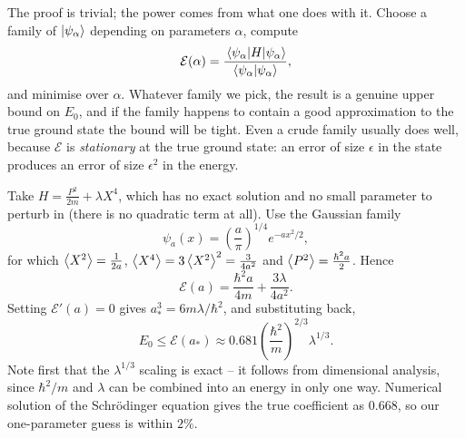 \documentclass[a4paper]{scrartcl}
\begin{document}
The proof is trivial; the power comes from what one does with it. Choose a family of  $\ket{\psi_\alpha}$ depending on parameters $\alpha$, compute
$$
\mathcal{E}(\alpha) = \frac{\mel{\psi_\alpha}{H}{\psi_\alpha}}{\braket{\psi_\alpha}{\psi_\alpha}},
$$
and minimise over $\alpha$. Whatever family we pick, the result is a genuine upper bound on $E_0$, and if the family happens to contain a good approximation to the true ground state the bound will be tight. Even a crude family usually does well, because $\mathcal{E}$ is \emph{stationary} at the true ground state: an error of size $\epsilon$ in the state produces an error of size $\epsilon^2$ in the energy.

\begin{center}
\end{center}

\begin{example}
    Take $H = \frac{P^2}{2m} + \lambda X^4$, which has no exact solution and no small parameter to perturb in (there is no quadratic term at all). Use the Gaussian family
    $$
    \psi_a(x) = \left(\frac{a}{\pi}\right)^{1/4}e^{-ax^2/2},
    $$
    for which $\expval{X^2} = \frac{1}{2a}$, $\expval{X^4} = 3\expval{X^2}^2 = \frac{3}{4a^2}$ and $\expval{P^2} = \frac{\hbar^2 a}{2}$. Hence
    $$
    \mathcal{E}(a) = \frac{\hbar^2 a}{4m} + \frac{3\lambda}{4a^2}.
    $$
    Setting $\mathcal{E}'(a) = 0$ gives $a_*^3 = 6m\lambda/\hbar^2$, and substituting back,
    $$
    E_0 \leq \mathcal{E}(a_*) \approx 0.681 \left( \frac{\hbar^2}{m} \right)^{2/3}\lambda^{1/3}.
    $$
    Note first that the $\lambda^{1/3}$ scaling is exact -- it follows from dimensional analysis, since $\hbar^2/m$ and $\lambda$ can be combined into an energy in only one way. Numerical solution of the Schr\"odinger equation gives the true coefficient as $0.668$, so our one-parameter guess is within $2\%$.
\end{example}
\end{document}
